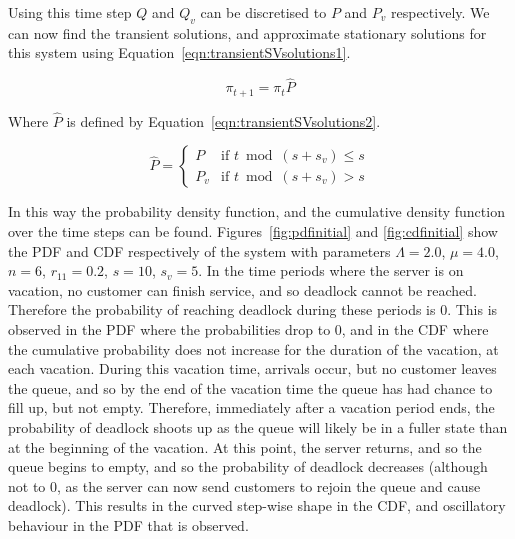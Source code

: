 \documentclass{article}
\begin{document}
Using this time step $Q$ and $Q_v$ can be discretised to $P$ and $P_v$ respectively.
We can now find the transient solutions, and approximate stationary solutions for this system using Equation~\ref{eqn:transientSVsolutions1}.

\begin{equation}\label{eqn:transientSVsolutions1}
\pi_{t+1} = \pi_{t} \hat{P}
\end{equation}

Where $\hat{P}$ is defined by Equation~\ref{eqn:transientSVsolutions2}.

\begin{equation}\label{eqn:transientSVsolutions2}
\hat{P} = \left\{
    \begin{array}{cc}
    P & \text{if } t \bmod (s + s_v) \leq s \\
    P_v & \text{if } t \bmod (s + s_v) > s
    \end{array}\right.
\end{equation}

In this way the probability density function, and the cumulative density function over the time steps can be found.
Figures~\ref{fig:pdfinitial} and \ref{fig:cdfinitial} show the PDF and CDF respectively of the system with parameters $\Lambda = 2.0$, $\mu = 4.0$, $n = 6$, $r_{11} = 0.2$, $s = 10$, $s_v = 5$. In the time periods where the server is on vacation, no customer can finish service, and so deadlock cannot be reached. Therefore the probability of reaching deadlock during these periods is $0$. This is observed in the PDF where the probabilities drop to $0$, and in the CDF where the cumulative probability does not increase for the duration of the vacation, at each vacation. During this vacation time, arrivals occur, but no customer leaves the queue, and so by the end of the vacation time the queue has had chance to fill up, but not empty. Therefore, immediately after a vacation period ends, the probability of deadlock shoots up as the queue will likely be in a fuller state than at the beginning of the vacation. At this point, the server returns, and so the queue begins to empty, and so the probability of deadlock decreases (although not to $0$, as the server can now send customers to rejoin the queue and cause deadlock). This results in the curved step-wise shape in the CDF, and oscillatory behaviour in the PDF that is observed.
\end{document}
